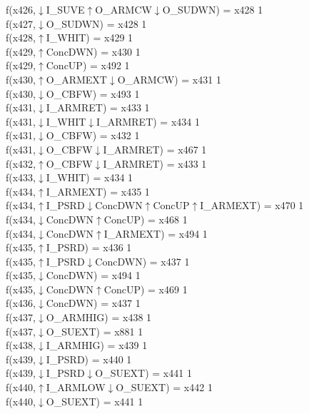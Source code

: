 f(x426,$\downarrow$I\_SUVE$\uparrow$O\_ARMCW$\downarrow$O\_SUDWN) = x428 {1} \\
f(x427,$\downarrow$O\_SUDWN) = x428 {1} \\
f(x428,$\uparrow$I\_WHIT) = x429 {1} \\
f(x429,$\uparrow$ConcDWN) = x430 {1} \\
f(x429,$\uparrow$ConcUP) = x492 {1} \\
f(x430,$\uparrow$O\_ARMEXT$\downarrow$O\_ARMCW) = x431 {1} \\
f(x430,$\downarrow$O\_CBFW) = x493 {1} \\
f(x431,$\downarrow$I\_ARMRET) = x433 {1} \\
f(x431,$\downarrow$I\_WHIT$\downarrow$I\_ARMRET) = x434 {1} \\
f(x431,$\downarrow$O\_CBFW) = x432 {1} \\
f(x431,$\downarrow$O\_CBFW$\downarrow$I\_ARMRET) = x467 {1} \\
f(x432,$\uparrow$O\_CBFW$\downarrow$I\_ARMRET) = x433 {1} \\
f(x433,$\downarrow$I\_WHIT) = x434 {1} \\
f(x434,$\uparrow$I\_ARMEXT) = x435 {1} \\
f(x434,$\uparrow$I\_PSRD$\downarrow$ConcDWN$\uparrow$ConcUP$\uparrow$I\_ARMEXT) = x470 {1} \\
f(x434,$\downarrow$ConcDWN$\uparrow$ConcUP) = x468 {1} \\
f(x434,$\downarrow$ConcDWN$\uparrow$I\_ARMEXT) = x494 {1} \\
f(x435,$\uparrow$I\_PSRD) = x436 {1} \\
f(x435,$\uparrow$I\_PSRD$\downarrow$ConcDWN) = x437 {1} \\
f(x435,$\downarrow$ConcDWN) = x494 {1} \\
f(x435,$\downarrow$ConcDWN$\uparrow$ConcUP) = x469 {1} \\
f(x436,$\downarrow$ConcDWN) = x437 {1} \\
f(x437,$\downarrow$O\_ARMHIG) = x438 {1} \\
f(x437,$\downarrow$O\_SUEXT) = x881 {1} \\
f(x438,$\downarrow$I\_ARMHIG) = x439 {1} \\
f(x439,$\downarrow$I\_PSRD) = x440 {1} \\
f(x439,$\downarrow$I\_PSRD$\downarrow$O\_SUEXT) = x441 {1} \\
f(x440,$\uparrow$I\_ARMLOW$\downarrow$O\_SUEXT) = x442 {1} \\
f(x440,$\downarrow$O\_SUEXT) = x441 {1} \\
